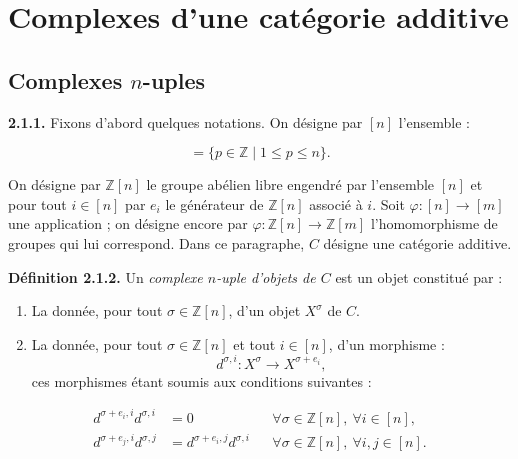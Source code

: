 \clearpage
{}%
\section{Complexes d'une catégorie additive}

\subsection{Complexes \texorpdfstring{$n$}{n}-uples}

\noindent\textbf{2.1.1.}\quad
Fixons d'abord quelques notations. On désigne par $[n]$ l'ensemble :

\begin{equation*}
  [n]=\{p\in\mathbb Z\mid 1\leq p\leq n\}.
\end{equation*}

On désigne par $\mathbb Z[n]$ le groupe abélien libre engendré par
l'ensemble $[n]$ et pour tout $i\in[n]$ par $e_i$ le générateur de
$\mathbb Z[n]$ associé à $i$. Soit $\varphi\colon[n]\longrightarrow[m]$
une application ; on désigne encore par
$\varphi\colon\mathbb Z[n]\longrightarrow\mathbb Z[m]$ l'homomorphisme
de groupes qui lui correspond. Dans ce paragraphe, $C$ désigne une
catégorie additive.

\noindent\textbf{Définition 2.1.2.}\quad
Un \emph{complexe $n$-uple d'objets de $C$} est un objet constitué par :

\begin{enumerate}
\renewcommand{\labelenumi}{\arabic{enumi})}
\item {}%
  La donnée, pour tout $\sigma\in\mathbb Z[n]$, d'un objet $X^\sigma$ de
  $C$.
\item {}%
  La donnée, pour tout $\sigma\in\mathbb Z[n]$ et tout $i\in[n]$, d'un
  morphisme :
  \begin{equation*}
    d^{\sigma,i}\colon X^\sigma\longrightarrow X^{\sigma+e_i},
  \end{equation*}
  ces morphismes étant soumis aux conditions suivantes :
\end{enumerate}

\begin{equation}
  \begin{aligned}
    d^{\sigma+e_i,i}d^{\sigma,i}&=0
      &&\forall\sigma\in\mathbb Z[n],\ \forall i\in[n],\\
    d^{\sigma+e_j,i}d^{\sigma,j}
      &=d^{\sigma+e_i,j}d^{\sigma,i}
      &&\forall\sigma\in\mathbb Z[n],\ \forall i,j\in[n].
  \end{aligned}
  \tag{2.1.2.1}
\end{equation}

